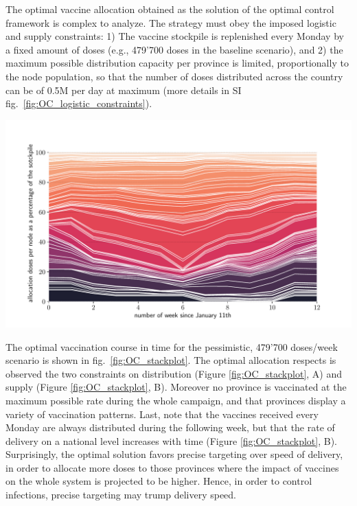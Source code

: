 The optimal vaccine allocation obtained as the solution of the optimal control framework is complex to analyze.%
The strategy must obey the imposed logistic and supply constraints: 1) The vaccine stockpile is replenished every Monday by a fixed amount of doses (e.g., 479'700 doses in the baseline scenario), and 2) the maximum possible distribution capacity per province is limited, proportionally to the node population, so that the number of doses distributed across the country can be of 0.5M per day at maximum (more details in SI fig.~\ref{fig:OC_logistic_constraints}). \begin{marginfigure}[-10\baselineskip]
    \centering
    \includegraphics{fig_italy-ocp/figuresSI/SI_ts_optimal_stackplot_proportional.pdf}
    \label{fig:OC_temporal_alloaction}
\end{marginfigure}

The optimal vaccination course in time for the pessimistic, 479'700 doses/week scenario is shown in fig.~\ref{fig:OC_stackplot}. The optimal allocation respects is observed the two constraints on distribution (Figure \ref{fig:OC_stackplot}, A) and supply (Figure \ref{fig:OC_stackplot}, B). Moreover no province is vaccinated at the maximum possible rate during the whole campaign, and that provinces display a variety of vaccination patterns. Last, note that the vaccines received every Monday are always distributed during the following week, but that the rate of delivery on a national level increases with time (Figure \ref{fig:OC_stackplot}, B). Surprisingly, the optimal solution favors precise targeting over speed of delivery, in order to allocate more doses to those provinces where the impact of vaccines on the whole system is projected to be higher. Hence, in order to control infections, precise targeting may trump delivery speed. 

